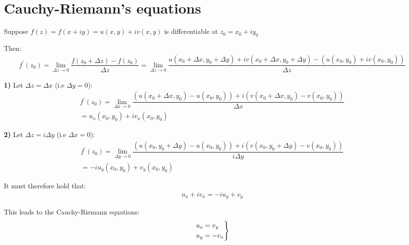 \section{Cauchy-Riemann's equations}\par
\noindent Suppose $f(z) = f(x+iy) = u(x,y)+iv(x,y)$ is differentiable at $z_0 = x_0+iy_0$\par
\noindent Then:
\begin{equation*}
  \begin{gathered}
    f^{\prime}(z_0) = \lim_{\Delta z\to0} \dfrac{f(z_0+\Delta z)-f(z_0)}{\Delta z} = \lim_{\Delta z\to0} \dfrac{u(x_0+\Delta x, y_0+\Delta y)+iv(x_0+\Delta x,y_0+ \Delta y)-(u(x_0,y_0)+iv(x_0,y_0))}{\Delta z}
  \end{gathered}
\end{equation*}
\par\bigskip
\noindent\textbf{1)} Let $\Delta z = \Delta x$ (i.e $\Delta y = 0$):
\begin{equation*}
  \begin{gathered}
    f^{\prime}(z_0) = \lim_{\Delta x\to0}\dfrac{(u(x_0+\Delta x,y_0)-u(x_0,y_0))+i(v(x_0+\Delta x,y_0)-v(x_0,y_0))}{\Delta x}\\
    = u_x(x_0,y_0)+iv_x(x_0,y_0)
  \end{gathered}
\end{equation*}
\par\bigskip
\noindent\textbf{2)} Let $\Delta z = i\Delta y$ (i.e $\Delta x = 0$):
\begin{equation*}
  \begin{gathered}
    f^{\prime}(z_0) = \lim_{\Delta y\to0}\dfrac{(u(x_0,y_0+\Delta y)-u(x_0,y_0))+i(v(x_0,y_0+\Delta y)-v(x_0,y_0))}{i\Delta y}\\
    = -iu_y(x_0,y_0)+v_y(x_0,y_0)
  \end{gathered}
\end{equation*}
\par\bigskip
\noindent It must therefore hold that:
\begin{equation*}
  \begin{gathered}
    u_x+iv_x = -iu_y+v_y
  \end{gathered}
\end{equation*}\par
\noindent This leads to the Cauchy-Riemann equations:
\begin{equation*}
  \begin{gathered}
    \begin{rcases*}
      u_x = v_y\\
      u_y = -v_x
    \end{rcases*}
  \end{gathered}
\end{equation*}
